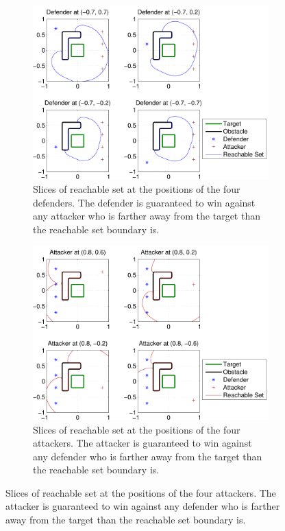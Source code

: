 \begin{figure}[H]
\centering
	\begin{subfigure}{0.45\textwidth}
	\centering
	\includegraphics[width=\textwidth]{"fig/fixed defender 2"}
	\caption{Slices of reachable set at the positions of the four defenders. The defender is guaranteed to win against any attacker who is farther away from the target than the reachable set boundary is.}
	\label{subfig:fixed_d_2}
	\end{subfigure}
	
	\begin{subfigure}{0.45\textwidth}
	\centering
	\includegraphics[width=\textwidth]{"fig/fixed attacker 2"}
	\caption{Slices of reachable set at the positions of the four attackers. The attacker is guaranteed to win against any defender who is farther away from the target than the reachable set boundary is.}
	\label{subfig:fixed_a_2}
	\end{subfigure}
\end{figure}

